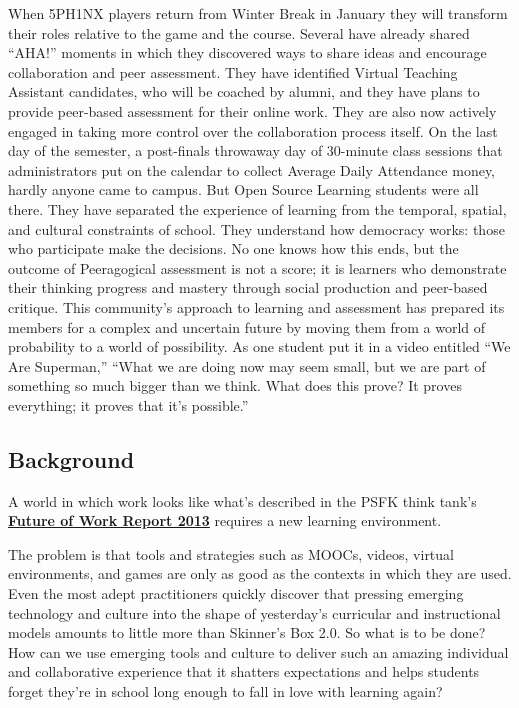 When 5PH1NX players return from Winter Break in January they will
transform their roles relative to the game and the course.  Several
have already shared ``AHA!'' moments in which they discovered ways to
share ideas and encourage collaboration and peer assessment.  They
have identified Virtual Teaching Assistant candidates, who will be
coached by alumni, and they have plans to provide peer-based
assessment for their online work. They are also now actively engaged
in taking more control over the collaboration process itself. On the
last day of the semester, a post-finals throwaway day of 30-minute
class sessions that administrators put on the calendar to collect
Average Daily Attendance money, hardly anyone came to campus. But Open
Source Learning students were all there. They have separated the
experience of learning from the temporal, spatial, and cultural
constraints of school. They understand how democracy works: those who
participate make the decisions. No one knows how this ends, but the
outcome of Peeragogical assessment is not a score; it is learners who
demonstrate their thinking progress and mastery through social
production and peer-based critique. This community's approach to
learning and assessment has prepared its members for a complex and
uncertain future by moving them from a world of probability to a world
of possibility. As one student put it in a video entitled ``We Are
Superman,'' ``What we are doing now may seem small, but we are part of
something so much bigger than we think. What does this prove? It
proves everything; it proves that it's possible.''

\subsection{Background}

A world in which work looks like what's described in the PSFK think tank's
\textbf{\href{http://www.slideshare.net/PSFK/psfk-presents-future-of-work-report}{Future
    of Work Report 2013}} requires a new learning environment.

The problem is that tools and strategies such as MOOCs, videos, virtual
environments, and games are only as good as the contexts in which they
are used. Even the most adept practitioners quickly discover that
pressing emerging technology and culture into the shape of yesterday's
curricular and instructional models amounts to little more than
Skinner's Box 2.0. So what is to be done? How can we use emerging tools
and culture to deliver such an amazing individual and collaborative
experience that it shatters expectations and helps students forget
they're in school long enough to fall in love with learning again?

